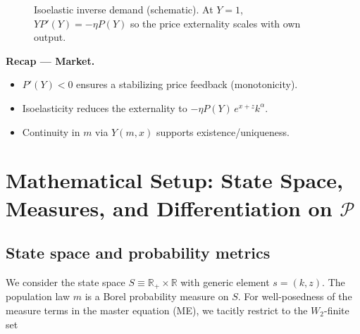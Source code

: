\documentclass[11pt,letterpaper,oneside]{article}
\numberwithin{equation}{section}
\newcommand{\R}{\mathbb{R}}
\newcommand{\1}{\mathbf{1}}
\begin{document}
\begin{figure}[ht]
\centering
{}
\caption{Isoelastic inverse demand (schematic). At $Y=1$, $Y P'(Y)=-\eta P(Y)$ so the price externality scales with own output.}
\end{figure}

\begin{tcolorbox}[didacticstyle]
\textbf{Recap — Market.}
\begin{itemize}[leftmargin=1.15em,itemsep=0.2em]
  \item $P'(Y)<0$ ensures a stabilizing price feedback (monotonicity).
  \item Isoelasticity reduces the externality to $-\eta P(Y)\,e^{x+z}k^\alpha$.
  \item Continuity in $m$ via $Y(m,x)$ supports existence/uniqueness.
\end{itemize}
\end{tcolorbox}

\section{Mathematical Setup: State Space, Measures, and Differentiation on \texorpdfstring{$\mathcal P$}{P}}\label{sec:math-setup}

\subsection{State space and probability metrics}\label{sec:state-metrics}
We consider the state space $S\equiv \R_+\times\R$ with generic element $s=(k,z)$. The population law $m$ is a Borel probability measure on $S$. For well-posedness of the measure terms in the master equation (ME), we tacitly restrict to the $W_2$-finite set
\end{document}
